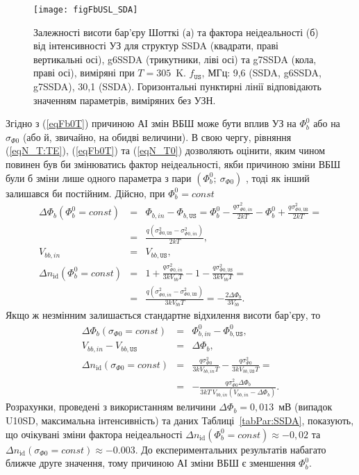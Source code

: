 \begin{figure}
\center
\texttt{[image: figFbUSL\_SDA]}
\caption{\label{figFbUSL_SDA}
Залежності висоти бар'єру Шотткі (а) та фактора неідеальності (б)  від інтенсивності УЗ для
структур SSDA (квадрати, праві вертикальні осі), g6SSDA (трикутники, ліві осі) та g7SSDA (кола, праві осі), виміряні при $T=305$~K.
$f_\mathtt{US}$, МГц: 9,6 (SSDA, g6SSDA, g7SSDA), 30,1 (SSDA).
Горизонтальні пунктирні лінії відповідають значенням параметрів, виміряних без УЗН.
}%
\end{figure}

Згідно з (\ref{eqFb0T}) причиною АІ змін ВБШ може бути вплив УЗ на $\Phi_b^0$ або на $\sigma_{\Phi0}$ (або й, звичайно, на обидві величини).
В свою чергу, рівняння  (\ref{eqN_T:TE}), (\ref{eqFb0T}) та (\ref{eqN_T0}) дозволяють оцінити, яким чином повинен був би змінюватись фактор неідеальності,
якби причиною зміни ВБШ були б зміни лише одного параметра з пари $(\Phi_b^0;\:\sigma_{\Phi0})$ , тоді як інший залишався би постійним.
Дійсно, при $\Phi_b^0=const$
\begin{eqnarray*}
  \Delta \Phi_b (\Phi_b^0=const)&=& \Phi_{b,in}-\Phi_{b,\mathtt{US}}=\Phi_b^0-\frac{q\sigma^2_{\Phi0,in}}{2kT}-\Phi_b^0+\frac{q\sigma^2_{\Phi0,\mathtt{US}}}{2kT}= \\
   &=&\frac{q\left(\sigma^2_{\Phi0,\mathtt{US}}-\sigma^2_{\Phi0,in}\right)}{2kT}, \\
   V_{bb,in}&=&V_{bb,\mathtt{US}},\\
  \Delta n_{\mathrm{id}} (\Phi_b^0=const)&=&1+\frac{q\sigma_{\Phi0,in}^2}{3kV_{bb}T}-1-\frac{q\sigma_{\Phi0,\mathtt{US}}^2}{3kV_{bb}T}=\\
  &=&\frac{q\left(\sigma^2_{\Phi0,in}-\sigma^2_{\Phi0,\mathtt{US}}\right)}{3kV_{bb}T}=-\frac{2\Delta \Phi_b}{3V_{bb}}.
\end{eqnarray*}
Якщо ж незмінним залишається стандартне відхилення висоти бар'єру, то
\begin{eqnarray*}
  \Delta \Phi_b (\sigma_{\Phi0}=const)&=&\Phi_{b,in}^0-\Phi_{b,\mathtt{US}}^0,\\
  V_{bb,in}-V_{bb,\mathtt{US}}&=&\Delta \Phi_b,\\
  \Delta n_{\mathrm{id}} (\sigma_{\Phi0}=const)&=&\frac{q\sigma_{\Phi0}^2}{3kV_{bb,in}T}-\frac{q\sigma_{\Phi0}^2}{3kV_{bb,\mathtt{US}}T}=\\
  &=&-\frac{q\sigma_{\Phi0}^2\Delta \Phi_b}{3kT\,V_{bb,in}(V_{bb,in}-\Delta \Phi_b)}.
\end{eqnarray*}
Розрахунки, проведені з використанням величини $\Delta \Phi_b=0,013$~мВ (випадок U10SD, максимальна інтенсивність) та даних Таблиці~\ref{tabPar:SSDA},
показують, що очікувані зміни фактора неідеальності $\Delta n_{\mathrm{id}} (\Phi_b^0=const)\approx-0,02$ та \mbox{$\Delta n_{\mathrm{id}}(\sigma_{\Phi0}=const)\approx-0.003$}.
До експериментальних результатів набагато ближче друге значення, тому причиною АІ зміни ВБШ є зменшення $\Phi_b^0$.

